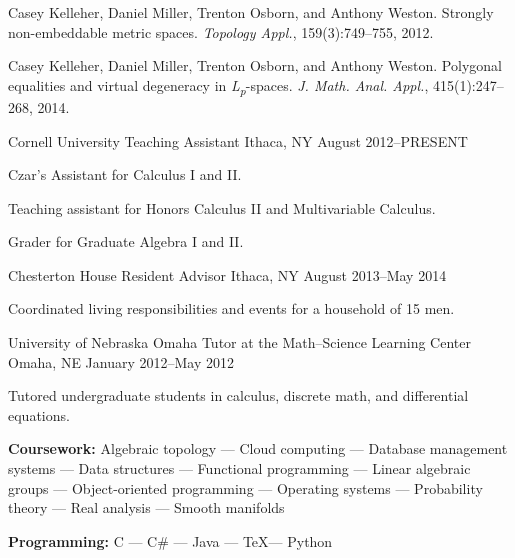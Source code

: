 \documentclass[11pt, letterpaper]{awesome-cv}
\begin{document}
\begin{cvparagraph}

Casey Kelleher, Daniel Miller, Trenton Osborn, and Anthony Weston. Strongly non-embeddable metric spaces. \emph{Topology Appl.}, 159(3):749--755, 2012. 

Casey Kelleher, Daniel Miller, Trenton Osborn, and Anthony Weston. Polygonal equalities and virtual degeneracy in \emph{L\textsubscript{p}}-spaces. \emph{J. Math. Anal. Appl.}, 415(1):247--268, 2014. 
\end{cvparagraph}






\begin{cventries}

\cventry
	{Cornell University}
	{Teaching Assistant}
	{Ithaca, NY}
	{August 2012--PRESENT}
	{
		\begin{cvitems}
			\item{Czar's Assistant for Calculus I and II.}
			\item{Teaching assistant for Honors Calculus II and Multivariable Calculus.}
			\item{Grader for Graduate Algebra I and II.}
		\end{cvitems}
	}

\cventry
	{Chesterton House}
	{Resident Advisor}
	{Ithaca, NY}
	{August 2013--May 2014}
	{
		\begin{cvitems}
			\item{Coordinated living responsibilities and events for a household of 15 men.}
		\end{cvitems}
	}

\cventry
	{University of Nebraska Omaha}
	{Tutor at the Math--Science Learning Center}
	{Omaha, NE}
	{January 2012--May 2012}
	{
		\begin{cvitems}
			\item{Tutored undergraduate students in calculus, discrete math, and differential equations.}
		\end{cvitems}
	}
	
\end{cventries}





\begin{cvparagraph}

\textbf{Coursework:} Algebraic topology --- Cloud computing --- Database management systems --- Data structures --- Functional programming --- Linear algebraic groups --- Object-oriented programming --- Operating systems --- Probability theory --- Real analysis --- Smooth manifolds

\textbf{Programming:} C --- C\# --- Java --- \TeX --- Python
\end{cvparagraph}
\end{document}
